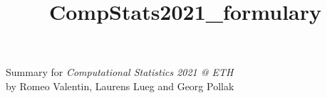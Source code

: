 \documentclass[
fourColumns,
landscape
]{formularyETH/formularyETH}
\title{CompStats2021_formulary}
\begin{document}
\noindent Summary for \emph{Computational Statistics 2021 @ ETH}\\
by Romeo Valentin, Laurens Lueg and Georg Pollak








\end{document}
